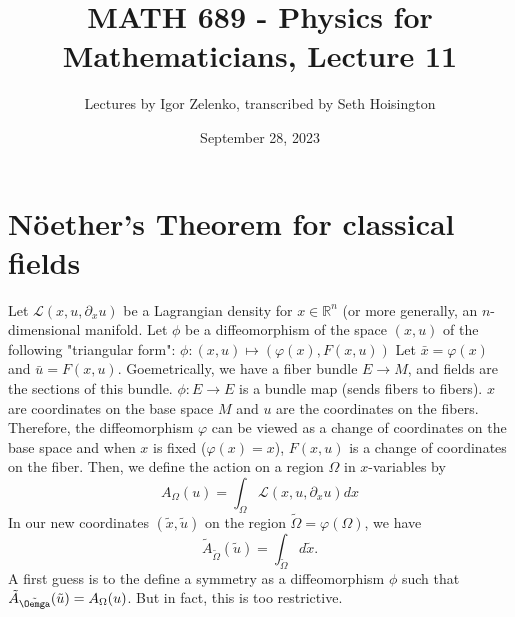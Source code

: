 \documentclass{article}
\title{MATH 689 - Physics for Mathematicians, Lecture 11}
\author{Lectures by Igor Zelenko, transcribed by Seth Hoisington}
\date{September 28, 2023}
\newcommand{\R}{\mathbb R}
\newcommand{\curlyL}{\mathcal L}
\newcommand{\nl}{\newline\newline\noindent}
\newcommand{\vhi}{\varphi}
\begin{document}
\maketitle

\section{N\"oether's Theorem for classical fields}
Let $\curlyL(x,u,\partial_x u)$ be a Lagrangian density for $x\in \R^n$ (or more generally, an $n$-dimensional manifold.
\nl
Let $\phi$ be a diffeomorphism of the space $(x,u)$ of the following "triangular form": $\phi:(x,u)\mapsto (\vhi(x),F(x,u))$ Let $\bar x =\vhi(x)$ and $\bar u = F(x,u)$. Goemetrically, we have a fiber bundle $E\to M$, and fields are the sections of this bundle. $\phi: E\to E$ is a bundle map (sends fibers to fibers).
\nl
$x$ are coordinates on the base space $M$ and $u$ are the coordinates on the fibers. Therefore, the diffeomorphism $\vhi$ can be viewed as a change of coordinates on the base space and when $x$ is fixed ($\vhi(x) = x$), $F(x,u)$ is a change of coordinates on the fiber.
\nl
Then, we define the action on a region $\Omega$ in $x$-variables by
\[A_\Omega(u) = \int_\Omega \curlyL(x,u,\partial_x u) dx\]
In our new coordinates $(\tilde x,\tilde u)$ on the region $\tilde\Omega = \vhi(\Omega)$, we have
\[\tilde A_{\tilde \Omega}(\tilde u) = \int_{\tilde\Omega}d\tilde x.\]
A first guess is to the define a symmetry as a diffeomorphism $\phi$ such that $\tilde A_{\tilde \Oemga}(\tilde u) = A_\Omega(u)$. But in fact, this is too restrictive. 
\end{document}
